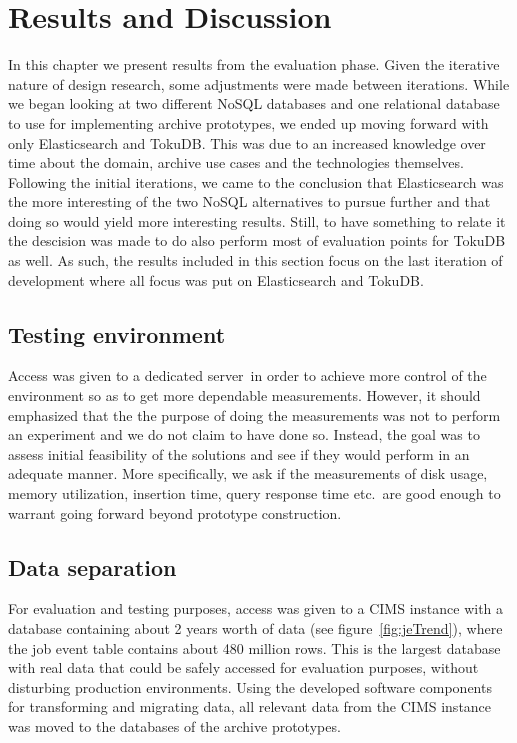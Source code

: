 \chapter{Results and Discussion}
\label{chap:results}

In this chapter we present results from the evaluation phase. Given the iterative nature of design research, some adjustments were made between iterations. While we began looking at two different NoSQL databases and one relational database to use for implementing archive prototypes, we ended up moving forward with only Elasticsearch and TokuDB. This was due to an increased knowledge over time about the domain, archive use cases and the technologies themselves. Following the initial iterations, we came to the conclusion that Elasticsearch was the more interesting of the two NoSQL alternatives to pursue further and that doing so would yield more interesting results. Still, to have something to relate it the descision was made to do also perform most of evaluation points for TokuDB as well.
As such, the results included in this section focus on the last iteration of development where all focus was put on Elasticsearch and TokuDB. 

\section{Testing environment}
Access was given to a dedicated server\footnotemark\ in order to achieve more control of the environment so as to get more dependable measurements. However, it should emphasized that the the purpose of doing the measurements was not to perform an experiment and we do not claim to have done so. Instead, the goal was to assess initial feasibility of the solutions and see if they would perform in an adequate manner. More specifically, we ask if the measurements of disk usage, memory utilization, insertion time, query response time etc.\ are good enough to warrant going forward beyond prototype construction.



\section{Data separation}
For evaluation and testing purposes, access was given to a CIMS instance with a database containing about 2 years worth of data (see figure~\ref{fig:jeTrend}), where the job event table contains about 480 million rows. This is the largest database with real data that could be safely accessed for evaluation purposes, without disturbing production environments. Using the developed software components for transforming and migrating data, all relevant data from the CIMS instance was moved to the databases of the archive prototypes.

